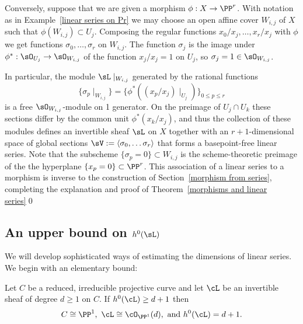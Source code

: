 Conversely, suppose that we are given a morphism $\phi: X\to \PP^{r}$. With notation as in Example~\ref{linear series on Pr} we may choose an open affine cover $W_{i,j}$ of $X$ such that $\phi(W_{i,j})\subset U_{j}$. Composing the regular
functions
$x_{0}/x_{j},\dots, x_{r}/x_{j}$ with $\phi$ we get functions $\sigma_{0},\dots,\sigma_{r}$ on $W_{i,j}$.  The function $\sigma_{j}$ is the image under $\phi^*: \sO_{U_j} \to \sO_{W_{i,j}}$ of the function $x_j/x_j = 1$ on $U_{j}$, so $\sigma_j = 1\in \sO_{W_{i,j}}$. 

In particular, the module $\sL\mid_{W_{i,j}}$ generated by the rational functions 
$$
\{\sigma_p\mid_{W_{i,j}}\}= 
\{\phi^*((x_p/x_j)\mid_{U_j})\}
_{0\leq p\leq r}
$$
 is a free $\sO_{W_{i,j}}$-module on 1 generator. On the preimage of $U_j\cap U_k$ these sections differ by the common unit $\phi^*(x_k/x_j)$, and thus the collection of these modules defines an invertible sheaf $\sL$ on $X$ together with an
$r+1$-dimensional space of global sections $\sV := \langle \sigma_0,\dots \sigma_r\rangle$ that forms a basepoint-free linear series. Note that the subscheme  $\{\sigma_p = 0\} \subset W_{i,j}$  is the scheme-theoretic preimage of the
the hyperplane $\{x_p = 0\}\subset \PP^r$. This association of a linear series to a morphism is inverse to the construction
of Section~\ref{morphism from series},  completing the explanation and proof of Theorem~\ref{morphisms and linear series}\qed

\subsection{An upper bound on $h^0(\sL)$}

We will develop sophisticated ways of estimating the dimensions of linear series. We begin with an elementary bound:

\begin{theorem}\label{characterization of P1}
Let $C$ be a reduced, irreducible projective curve and let $\cL$ be an invertible sheaf of degree $d\geq 1$ on $C$. If $h^0(\cL) \geq d+1$ then
$$C \cong \PP^1,\ \cL \cong \cO_{\PP^1}(d), \hbox{ and  } h^0(\cL) = d+1.
$$
\end{theorem}

